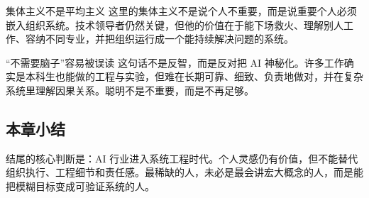 \begin{knowledgebox}{集体主义不是平均主义}
这里的集体主义不是说个人不重要，而是说重要个人必须嵌入组织系统。技术领导者仍然关键，但他的价值在于能下场救火、理解别人工作、容纳不同专业，并把组织运行成一个能持续解决问题的系统。
\end{knowledgebox}

\begin{warningbox}{“不需要脑子”容易被误读}
这句话不是反智，而是反对把 AI 神秘化。许多工作确实是本科生也能做的工程与实验，但难在长期可靠、细致、负责地做对，并在复杂系统里理解因果关系。聪明不是不重要，而是不再足够。
\end{warningbox}

\subsection{本章小结}

结尾的核心判断是：AI 行业进入系统工程时代。个人灵感仍有价值，但不能替代组织执行、工程细节和责任感。最稀缺的人，未必是最会讲宏大概念的人，而是能把模糊目标变成可验证系统的人。

